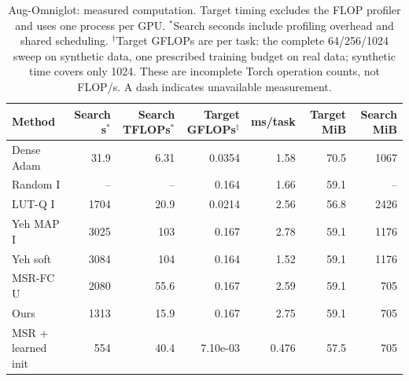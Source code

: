 \begin{table}[htbp]
\centering\small\setlength{\tabcolsep}{3.5pt}
\begin{tabular}{lrrrrrr}
\toprule
Method & Search s$^*$ & Search TFLOPs$^*$ & Target GFLOPs$^\dagger$ & ms/task & Target MiB & Search MiB\\
\midrule
Dense Adam & 31.9 & 6.31 & 0.0354 & 1.58 & 70.5 & 1067\\
Random I & -- & -- & 0.164 & 1.66 & 59.1 & --\\
LUT-Q I & 1704 & 20.9 & 0.0214 & 2.56 & 56.8 & 2426\\
Yeh MAP I & 3025 & 103 & 0.167 & 2.78 & 59.1 & 1176\\
Yeh soft & 3084 & 104 & 0.164 & 1.52 & 59.1 & 1176\\
MSR-FC U & 2080 & 55.6 & 0.167 & 2.59 & 59.1 & 705\\
Ours & 1313 & 15.9 & 0.167 & 2.75 & 59.1 & 705\\
MSR + learned init & 554 & 40.4 & 7.10e-03 & 0.476 & 57.5 & 705\\
\bottomrule\end{tabular}
\caption{Aug-Omniglot: measured computation. Target timing excludes the FLOP profiler and uses one process per GPU. $^*$Search seconds include profiling overhead and shared scheduling. $^\dagger$Target GFLOPs are per task: the complete 64/256/1024 sweep on synthetic data, one prescribed training budget on real data; synthetic time covers only 1024. These are incomplete Torch operation counts, not FLOP/s. A dash indicates unavailable measurement.}
\end{table}
